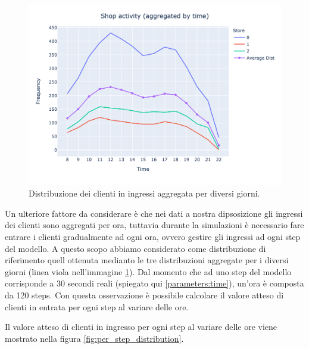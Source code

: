 \begin{figure}[H]
	\centering
	\includegraphics[width=14cm]{"images/shop_activity_aggregated.png"}
	\caption{Distribuzione dei clienti in ingressi aggregata per diversi giorni.}
	\label{fig:shop_activity_aggregated}
\end{figure}


Un ulteriore fattore da considerare è che nei dati a nostra dipsosizione gli ingressi dei clienti sono aggregati per ora, tuttavia durante la simulazioni è necessario fare entrare i clienti gradualmente ad ogni ora, ovvero gestire gli ingressi ad ogni step del modello. A questo scopo abbiamo considerato come distribuzione di riferimento quell ottenuta medianto le tre distribuzioni aggregate per i diversi giorni (linea viola nell'immagine \ref{fig:shop_activity_aggregated}). Dal momento che ad uno step del modello corrisponde a 30 secondi reali (spiegato qui \ref{parameters:time}), un'ora è composta da 120 steps. Con questa osservazione è possibile calcolare il valore atteso di clienti in entrata per ogni step al variare delle ore.

Il valore atteso di clienti in ingresso per ogni step al variare delle ore viene mostrato nella figura \ref{fig:per_step_distribution}.

